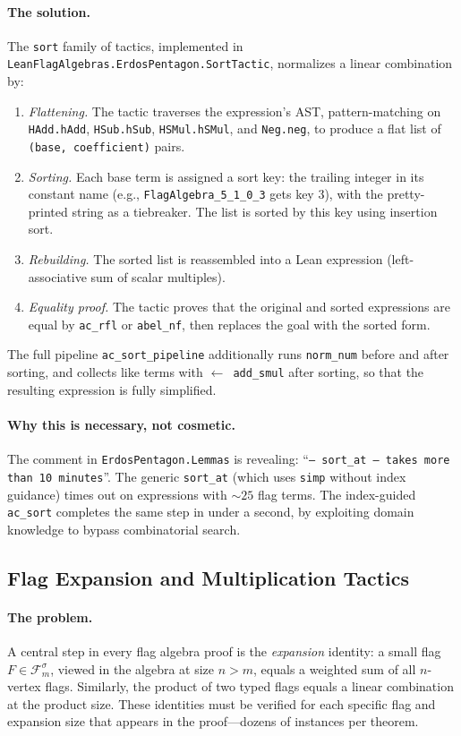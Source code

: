 \documentclass{article}
\newcommand{\Flag}[1]{\mathcal{F}^{#1}}
\newcommand{\lean}[1]{\texttt{#1}}
\begin{document}
\paragraph{The solution.}
The \lean{sort} family of tactics, implemented in
\lean{LeanFlagAlgebras.ErdosPentagon.SortTactic}, normalizes a linear
combination by:
\begin{enumerate}
  \item \emph{Flattening.}  The tactic traverses the expression's AST,
    pattern-matching on \lean{HAdd.hAdd}, \lean{HSub.hSub},
    \lean{HSMul.hSMul}, and \lean{Neg.neg}, to produce a flat list of
    \lean{(base, coefficient)} pairs.
  \item \emph{Sorting.}  Each base term is assigned a sort key: the trailing
    integer in its constant name (e.g., \lean{FlagAlgebra\_5\_1\_0\_3} gets
    key $3$), with the pretty-printed string as a tiebreaker.  The list is
    sorted by this key using insertion sort.
  \item \emph{Rebuilding.}  The sorted list is reassembled into a Lean
    expression (left-associative sum of scalar multiples).
  \item \emph{Equality proof.}  The tactic proves that the original and sorted
    expressions are equal by \lean{ac\_rfl} or \lean{abel\_nf}, then replaces
    the goal with the sorted form.
\end{enumerate}
The full pipeline \lean{ac\_sort\_pipeline} additionally runs \lean{norm\_num}
before and after sorting, and collects like terms with \lean{$\leftarrow$ add\_smul}
after sorting, so that the resulting expression is fully simplified.

\paragraph{Why this is necessary, not cosmetic.}
The comment in \lean{ErdosPentagon.Lemmas} is revealing:
``\texttt{-- sort\_at -- takes more than 10 minutes}''.
The generic \lean{sort\_at} (which uses \lean{simp} without index guidance)
times out on expressions with $\sim 25$ flag terms.  The index-guided
\lean{ac\_sort} completes the same step in under a second, by exploiting domain
knowledge to bypass combinatorial search.

\subsection{Flag Expansion and Multiplication Tactics}

\paragraph{The problem.}
A central step in every flag algebra proof is the \emph{expansion} identity: a
small flag $F \in \Flag{\sigma}_m$, viewed in the algebra at size $n > m$,
equals a weighted sum of all $n$-vertex flags.  Similarly, the product of two
typed flags equals a linear combination at the product size.  These identities
must be verified for each specific flag and expansion size that appears in the
proof---dozens of instances per theorem.
\end{document}
